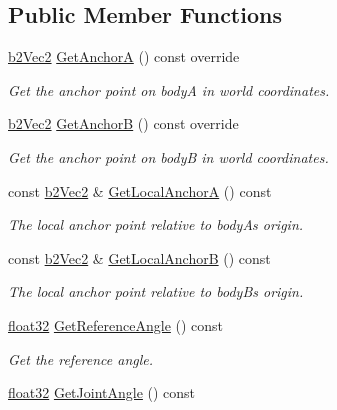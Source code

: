 \subsection*{Public Member Functions}
\begin{DoxyCompactItemize}
\item 
\mbox{\hyperlink{structb2_vec2}{b2\+Vec2}} \mbox{\hyperlink{classb2_revolute_joint_a9878591c460a4e1575f8a77c237608ae}{Get\+AnchorA}} () const override
\begin{DoxyCompactList}\small\item\em Get the anchor point on bodyA in world coordinates. \end{DoxyCompactList}\item 
\mbox{\hyperlink{structb2_vec2}{b2\+Vec2}} \mbox{\hyperlink{classb2_revolute_joint_aa30a5d414b2ff699cc17567ff6e53e6b}{Get\+AnchorB}} () const override
\begin{DoxyCompactList}\small\item\em Get the anchor point on bodyB in world coordinates. \end{DoxyCompactList}\item 
const \mbox{\hyperlink{structb2_vec2}{b2\+Vec2}} \& \mbox{\hyperlink{classb2_revolute_joint_af8cefd09d50a4e349613722809b8c823}{Get\+Local\+AnchorA}} () const
\begin{DoxyCompactList}\small\item\em The local anchor point relative to bodyA\textquotesingle{}s origin. \end{DoxyCompactList}\item 
const \mbox{\hyperlink{structb2_vec2}{b2\+Vec2}} \& \mbox{\hyperlink{classb2_revolute_joint_ac58e115df370181adc1ea1c486d84dc6}{Get\+Local\+AnchorB}} () const
\begin{DoxyCompactList}\small\item\em The local anchor point relative to bodyB\textquotesingle{}s origin. \end{DoxyCompactList}\item 
\mbox{\hyperlink{b2_settings_8h_aacdc525d6f7bddb3ae95d5c311bd06a1}{float32}} \mbox{\hyperlink{classb2_revolute_joint_ae84b9659fe94f41f54f43d3f64ee0741}{Get\+Reference\+Angle}} () const
\begin{DoxyCompactList}\small\item\em Get the reference angle. \end{DoxyCompactList}\item 
\mbox{\hyperlink{b2_settings_8h_aacdc525d6f7bddb3ae95d5c311bd06a1}{float32}} \mbox{\hyperlink{classb2_revolute_joint_a2a83b2276c71bf287771004838f2b507}{Get\+Joint\+Angle}} () const

\end{DoxyCompactItemize}
